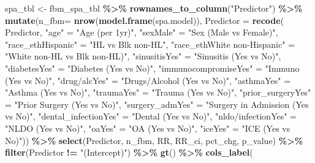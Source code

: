\documentclass[
]{article}
\newenvironment{Shaded}{\begin{snugshade}}{\end{snugshade}}
\newcommand{\AttributeTok}[1]{\textcolor[rgb]{0.13,0.29,0.53}{#1}}
\newcommand{\FunctionTok}[1]{\textcolor[rgb]{0.13,0.29,0.53}{\textbf{#1}}}
\newcommand{\NormalTok}[1]{#1}
\newcommand{\OtherTok}[1]{\textcolor[rgb]{0.56,0.35,0.01}{#1}}
\newcommand{\SpecialCharTok}[1]{\textcolor[rgb]{0.81,0.36,0.00}{\textbf{#1}}}
\newcommand{\StringTok}[1]{\textcolor[rgb]{0.31,0.60,0.02}{#1}}
\begin{document}
\begin{Shaded}
\begin{Highlighting}[]
\NormalTok{spa\_tbl }\OtherTok{\textless{}{-}}\NormalTok{ fbm\_spa\_tbl }\SpecialCharTok{\%\textgreater{}\%}
  \FunctionTok{rownames\_to\_column}\NormalTok{(}\StringTok{"Predictor"}\NormalTok{) }\SpecialCharTok{\%\textgreater{}\%} 
  \FunctionTok{mutate}\NormalTok{(}\AttributeTok{n\_fbm=} \FunctionTok{nrow}\NormalTok{(}\FunctionTok{model.frame}\NormalTok{(spa.model)),}
      \AttributeTok{Predictor =} \FunctionTok{recode}\NormalTok{(}
\NormalTok{        Predictor,}
        \StringTok{"age"} \OtherTok{=} \StringTok{"Age (per 1yr)"}\NormalTok{,}
        \StringTok{"sexMale"} \OtherTok{=} \StringTok{"Sex (Male vs Female)"}\NormalTok{,}
        \StringTok{"race\_ethHispanic"} \OtherTok{=} \StringTok{"HL vs Blk non{-}HL"}\NormalTok{,}
        \StringTok{"race\_ethWhite non{-}Hispanic"} \OtherTok{=} \StringTok{"White non{-}HL vs Blk non{-}HL)"}\NormalTok{,}
        \StringTok{"sinusitisYes"} \OtherTok{=} \StringTok{"Sinusitis (Yes vs No)"}\NormalTok{,}
        \StringTok{"diabetesYes"} \OtherTok{=} \StringTok{"Diabetes (Yes vs No)"}\NormalTok{,}
        \StringTok{"immunocompromiseYes"} \OtherTok{=} \StringTok{"Immuno (Yes vs No)"}\NormalTok{,}
        \StringTok{"\textasciigrave{}drug/alc\textasciigrave{}Yes"} \OtherTok{=} \StringTok{"Drugs/Alcohol (Yes vs No)"}\NormalTok{,}
        \StringTok{"asthmaYes"} \OtherTok{=} \StringTok{"Asthma (Yes vs No)"}\NormalTok{,}
        \StringTok{"traumaYes"} \OtherTok{=} \StringTok{"Trauma (Yes vs No)"}\NormalTok{,}
        \StringTok{"prior\_surgeryYes"} \OtherTok{=} \StringTok{"Prior Surgery (Yes vs No)"}\NormalTok{,}
        \StringTok{"surgery\_admYes"} \OtherTok{=} \StringTok{"Surgery in Admission (Yes vs No)"}\NormalTok{,}
        \StringTok{"dental\_infectionYes"} \OtherTok{=} \StringTok{"Dental (Yes vs No)"}\NormalTok{,}
        \StringTok{"\textasciigrave{}nldo/infection\textasciigrave{}Yes"} \OtherTok{=} \StringTok{"NLDO (Yes vs No)"}\NormalTok{,}
        \StringTok{"oaYes"} \OtherTok{=} \StringTok{"OA (Yes vs No)"}\NormalTok{,}
        \StringTok{"iceYes"} \OtherTok{=} \StringTok{"ICE (Yes vs No)"}\NormalTok{)) }\SpecialCharTok{\%\textgreater{}\%} 
  \FunctionTok{select}\NormalTok{(Predictor, n\_fbm, RR, RR\_ci, pct\_chg, p\_value) }\SpecialCharTok{\%\textgreater{}\%}
  \FunctionTok{filter}\NormalTok{(Predictor }\SpecialCharTok{!=} \StringTok{"(Intercept)"}\NormalTok{) }\SpecialCharTok{\%\textgreater{}\%} 
  \FunctionTok{gt}\NormalTok{() }\SpecialCharTok{\%\textgreater{}\%}
  \FunctionTok{cols\_label}\NormalTok{(}

\end{Highlighting}
\end{Shaded}
\end{document}
